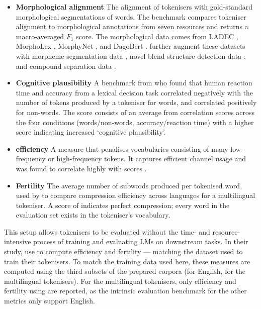 \begin{itemize}[leftmargin=*]
    \item \textbf{Morphological alignment} The alignment of tokenisers with gold-standard morphological segmentations of words. The benchmark compares tokeniser alignment to morphological annotations from seven resources and returns a macro-averaged $F_1$ score. The morphological data comes from LADEC \citep{gagne2019ladec}, MorphoLex \citep{sanchez2018morpholex}, MorphyNet \citep{batsuren-etal-2021-morphynet}, and DagoBert \citep{hofmann-etal-2020-dagobert}. \citet{uzan-etal-2024-greed} further augment these datasets with morpheme segmentation data \citep{batsuren-etal-2022-unimorph}, novel blend structure detection data \citep{pinter-etal-2021-will}, and compound separation data \citep{minixhofer-etal-2023-compoundpiece}.
    \item \textbf{Cognitive plausibility} A benchmark from \citet{beinborn-pinter-2023-analyzing} who found that human reaction time and accuracy from a lexical decision task correlated negatively with the number of tokens produced by a tokeniser for words, and correlated positively for non-words. The score consists of an average from correlation scores across the four conditions (words/non-words, accuracy/reaction time) with a higher score indicating increased `cognitive plausibility'.
    \item \textbf{\renyi efficiency} A measure that penalises vocabularies consisting of many low-frequency or high-frequency tokens. It captures efficient channel usage and was found to correlate highly with  scores \citep{zouhar-etal-2023-tokenization}.
    \item \textbf{Fertility} The average number of subwords produced per tokenised word, used by \citet{acs2019exploring} to compare compression efficiency across languages for a multilingual tokeniser. A score of  indicates perfect compression; every word in the evaluation set exists in the tokeniser's vocabulary.
\end{itemize}

This setup allows tokenisers to be evaluated without the time- and resource-intensive process of training and evaluating LMs on downstream tasks. In their study, \citet{uzan-etal-2024-greed} use \minipile \citep{kaddour2023minipile} to compute \renyi efficiency and fertility --- matching the dataset used to train their tokenisers. To match the training data used here, these measures are computed using the third subsets of the prepared corpora (\fineweb for English, \commoncorpus for the multilingual tokenisers). For the multilingual tokenisers, only \renyi efficiency and fertility using \commoncorpus are reported, as the intrinsic evaluation benchmark for the other metrics only support English.

